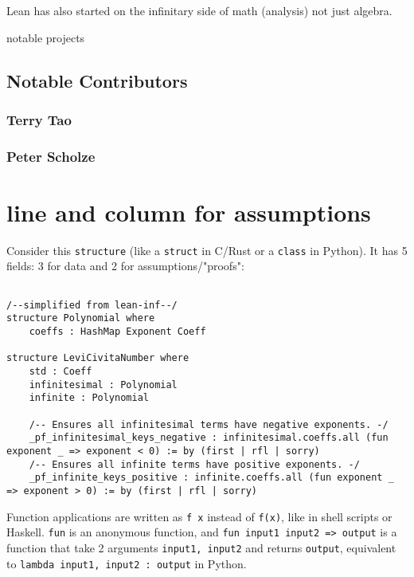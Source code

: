 \documentclass{article}
\begin{document}
Lean has also started on the infinitary side of math (analysis) not just algebra.

notable projects


\subsection{Notable Contributors}
\subsubsection{Terry Tao}

\subsubsection{Peter Scholze}

\section{line and column for assumptions}

Consider this \texttt{structure} (like a \texttt{struct} in C/Rust or a \texttt{class} in Python). It has 5 fields: 3 for data and 2 for assumptions/"proofs":

\begin{verbatim}

/--simplified from lean-inf--/
structure Polynomial where
    coeffs : HashMap Exponent Coeff

structure LeviCivitaNumber where
    std : Coeff
    infinitesimal : Polynomial
    infinite : Polynomial

    /-- Ensures all infinitesimal terms have negative exponents. -/
    _pf_infinitesimal_keys_negative : infinitesimal.coeffs.all (fun exponent _ => exponent < 0) := by (first | rfl | sorry)
    /-- Ensures all infinite terms have positive exponents. -/
    _pf_infinite_keys_positive : infinite.coeffs.all (fun exponent _ => exponent > 0) := by (first | rfl | sorry)
\end{verbatim}

Function applications are written as \texttt{f x} instead of \texttt{f(x)}, like in shell scripts or Haskell. \texttt{fun} is an anonymous function, and \texttt{fun input1 input2 => output} is a function that take 2 arguments \texttt{input1, input2} and returns \texttt{output}, equivalent to \texttt{lambda input1, input2 : output} in Python.
\end{document}
